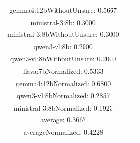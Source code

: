 \documentclass[a4paper]{article}
\begin{document}
\begin{tabular}{ccc}
gemma4:12bWithoutUnsure: 0.5667 \\ ministral-3:8b: 0.3000 \\ ministral-3:8bWithoutUnsure: 0.3000 \\ qwen3-vl:8b: 0.2000 \\ qwen3-vl:8bWithoutUnsure: 0.2000 \\ llava:7bNormalized: 0.5333 \\ gemma4:12bNormalized: 0.6800 \\ qwen3-vl:8bNormalized: 0.2857 \\ ministral-3:8bNormalized: 0.1923 \\ average: 0.3667 \\ averageNormalized: 0.4228 \end{minipage}\\
\end{tabular}

\vspace{5mm}
\end{document}
